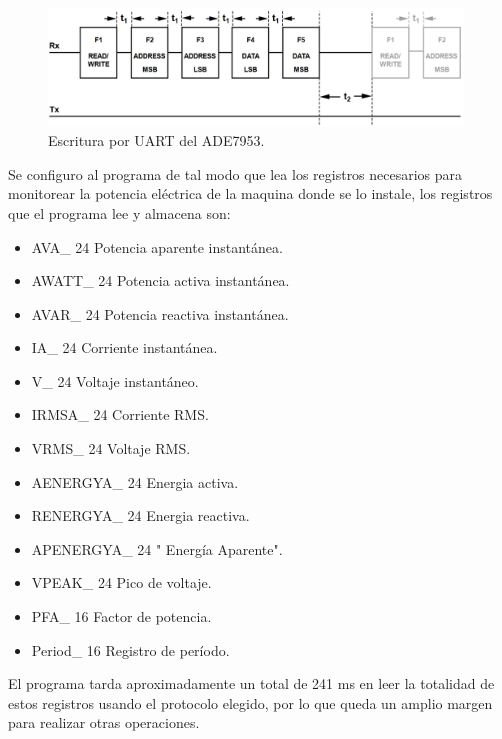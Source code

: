 \begin{figure}[htb]
	\centering
	\includegraphics[width=110mm,keepaspectratio]{Figures/ade7uartwrite.png}
	\caption{Escritura por UART del ADE7953.}
	\label{fig:ADEwrite}
\end{figure}

Se configuro al programa de tal modo que lea los registros necesarios para monitorear la potencia eléctrica de la maquina donde se lo instale, los registros que el programa lee y almacena son:

\begin{itemize}
\item AVA\_ 24 Potencia aparente instantánea. 
\item AWATT\_ 24 Potencia activa instantánea.
\item AVAR\_ 24 Potencia reactiva instantánea. 
\item IA\_ 24 Corriente instantánea.
\item V\_ 24 Voltaje instantáneo.
\item IRMSA\_ 24 Corriente RMS.
\item VRMS\_ 24 Voltaje RMS.
\item AENERGYA\_ 24 Energia activa.
\item RENERGYA\_ 24 Energia reactiva.
\item APENERGYA\_ 24  " Energía Aparente".
\item VPEAK\_ 24 Pico de voltaje.
\item PFA\_ 16 Factor de potencia.
\item Period\_ 16 Registro de período.
\end{itemize}


El programa tarda aproximadamente un total de 241 ms en leer la totalidad de estos registros usando el protocolo elegido, por lo que queda un amplio margen para realizar otras operaciones.


